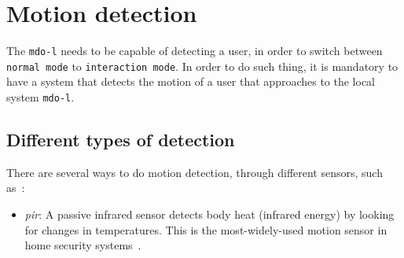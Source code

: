 %
\section{Motion detection}
\label{sec:motion-detection}
The \texttt{\gls{mdo-l}} needs to be capable of detecting a user, in order to switch between \texttt{normal mode} to \texttt{interaction mode}.
In order to do such thing, it is mandatory to have a system that detects the motion of a user that approaches to the local system \texttt{\gls{mdo-l}}.

\subsection{Different types of detection}
There are several ways to do motion detection, through different sensors, such as~\cite{sensors-list}:
%
\begin{itemize}
\item \emph{\gls{pir}}: A passive infrared sensor detects body heat (infrared energy) by looking for changes in temperatures. 
This is the most-widely-used motion sensor in home security systems~\cite{sensors-list}.


\end{itemize}

